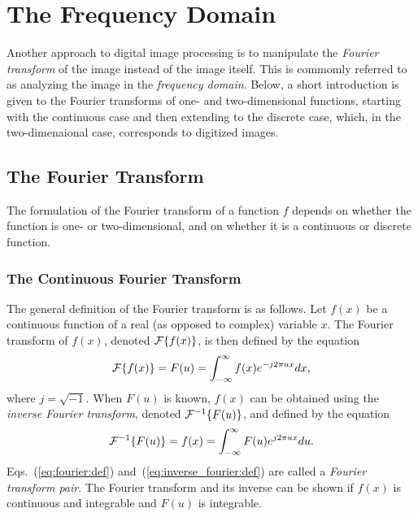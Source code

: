 
\section{The Frequency Domain}
\label{image:frequency}

Another approach to digital image processing is to manipulate the {\em
  Fourier transform\/} of the image instead of the image itself.  This
is commomly referred to as analyzing the image in the {\em frequency
  domain\/}.  Below, a short introduction is given to the Fourier
transforms of one- and two-dimensional functions, starting with the
continuous case and then extending to the discrete case, which, in the
two-dimenaional case, corresponds to digitized images.

\subsection{The Fourier Transform}
\label{image:frequency:fourier}

The formulation of the Fourier transform of a function $f$ depends on
whether the function is one- or two-dimensional, and on whether it is
a continuous or discrete function.

\subsubsection{The Continuous Fourier Transform}

The general definition of the Fourier transform is as follows.  Let
$f(x)$ be a continuous function of a real (as opposed to complex)
variable $x$.  The Fourier transform of $f(x)$, denoted ${\cal
  F}\{f(x)\}$, is then defined by the equation
\begin{equation}
\label{eq:fourier:def}
  {\cal F}\{f(x)\}=F(u)=\int_{-\infty}^{\infty}f(x)e^{-j2\pi
    ux}dx\mbox{,} 
\end{equation}
where $j=\sqrt{-1}$.  When $F(u)$ is known, $f(x)$ can be obtained
using the {\em inverse Fourier transform\/}, denoted ${\cal
  F}^{-1}\{F(u)\}$, and defined by the equation
\begin{equation}
\label{eq:inverse_fourier:def}
  {\cal F}^{-1}\{F(u)\}=f(x)=\int_{-\infty}^{\infty}F(u)e^{j2\pi
    ux}du\mbox{.}
\end{equation}
Eqs.~(\ref{eq:fourier:def}) and~(\ref{eq:inverse_fourier:def}) are
called a {\em Fourier transform pair\/}.  The Fourier transform and
its inverse can be shown if $f(x)$ is continuous and integrable and
$F(u)$ is integrable.

